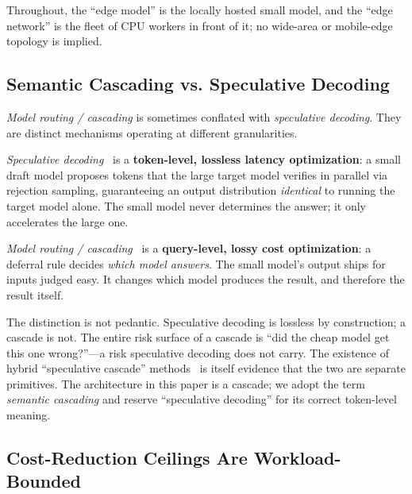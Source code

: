 \documentclass[conference]{IEEEtran}
\begin{document}
Throughout, the ``edge model'' is the locally hosted small model, and the ``edge network'' is the fleet of CPU workers in front of it; no wide-area or mobile-edge topology is implied.

\subsection{Semantic Cascading vs. Speculative Decoding}
\label{sec:terminology}

\emph{Model routing / cascading} is sometimes conflated with \emph{speculative decoding}. They are distinct mechanisms operating at different granularities.

\emph{Speculative decoding}~\cite{leviathan,chensp} is a \textbf{token-level, lossless latency optimization}: a small draft model proposes tokens that the large target model verifies in parallel via rejection sampling, guaranteeing an output distribution \emph{identical} to running the target model alone. The small model never determines the answer; it only accelerates the large one.

\emph{Model routing / cascading}~\cite{frugalgpt} is a \textbf{query-level, lossy cost optimization}: a deferral rule decides \emph{which model answers}. The small model's output ships for inputs judged easy. It changes which model produces the result, and therefore the result itself.

The distinction is not pedantic. Speculative decoding is lossless by construction; a cascade is not. The entire risk surface of a cascade is ``did the cheap model get this one wrong?''---a risk speculative decoding does not carry. The existence of hybrid ``speculative cascade'' methods~\cite{fastercascades} is itself evidence that the two are separate primitives. The architecture in this paper is a cascade; we adopt the term \emph{semantic cascading} and reserve ``speculative decoding'' for its correct token-level meaning.

\subsection{Cost-Reduction Ceilings Are Workload-Bounded}
\label{sec:cost}
\end{document}
